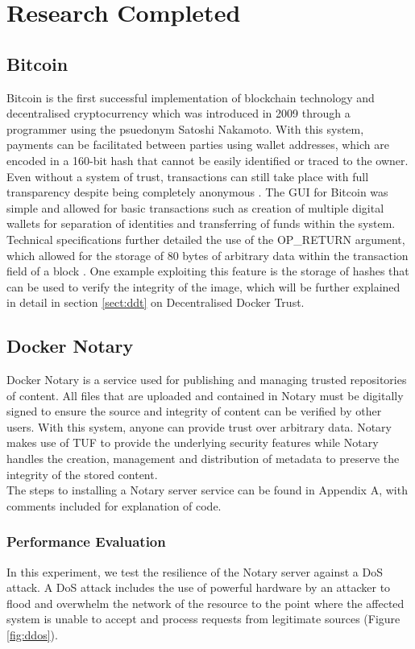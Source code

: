 \documentclass[a4paper,12pt]{article}
\begin{document}
{	\section{Research Completed}
	\subsection{Bitcoin}
	{\par Bitcoin is the first successful implementation of blockchain technology and decentralised cryptocurrency which was introduced in 2009 through a programmer using the psuedonym Satoshi Nakamoto. With this system, payments can be facilitated between parties using wallet addresses, which are encoded in a 160-bit hash that cannot be easily identified or traced to the owner. Even without a system of trust, transactions can still take place with full transparency despite being completely anonymous \cite{Bitcoinimplement}. The \ac{GUI} for Bitcoin was simple and allowed for basic transactions such as creation of multiple digital wallets for separation of identities and transferring of funds within the system. \\\newline Technical specifications further detailed the use of the OP\_RETURN argument, which allowed for the storage of 80 bytes of arbitrary data within the transaction field of a block \cite{opreturn}. One example exploiting this feature is the storage of hashes that can be used to verify the integrity of the image, which will be further explained in detail in section \ref{sect:ddt} on Decentralised Docker Trust.
	}
	\subsection{Docker Notary}
	{\par Docker Notary is a service used for publishing and managing trusted repositories of content. All files that are uploaded and contained in Notary must be digitally signed to ensure the source and integrity of content can be verified by other users. With this system, anyone can provide trust over arbitrary data. Notary makes use of \ac{TUF} to provide the underlying security features while Notary handles the creation, management and distribution of metadata to preserve the integrity of the stored content.
		\\\newline The steps to installing a Notary server service can be found in Appendix A, with comments included for explanation of code.
	\subsubsection{Performance Evaluation}
	{\par \noindent In this experiment, we test the resilience of the Notary server against a \ac{DoS} attack. A \ac{DoS} attack includes the use of powerful hardware by an attacker to flood and overwhelm the network of the resource to the point where the affected system is unable to accept and process requests from legitimate sources (Figure \ref{fig:ddos}).}
	
}}
\end{document}
